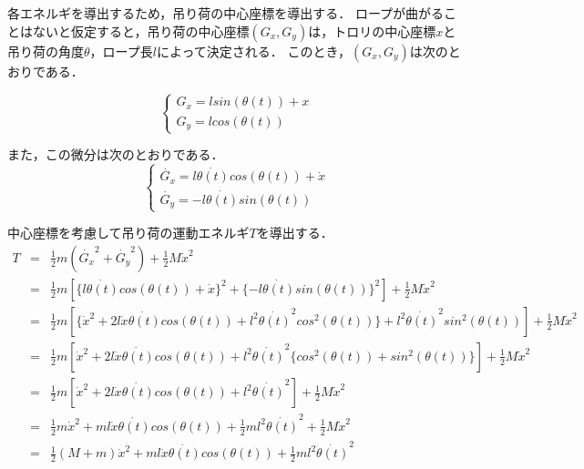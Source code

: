 \documentclass[dvipdfmx,titlepage,a4j]{jsarticle}  %
\begin{document}
各エネルギを導出するため，吊り荷の中心座標を導出する．
ロープが曲がることはないと仮定すると，吊り荷の中心座標$(G_x, G_y)$は，トロリの中心座標$x$と吊り荷の角度$\theta$，ロープ長$l$によって決定される．
このとき，$(G_x, G_y)$は次のとおりである．

\begin{equation}
  \begin{cases}
    G_x = l sin(\theta(t)) + x \nonumber \\
    G_y = l cos(\theta(t))
  \end{cases}
\end{equation}

また，この微分は次のとおりである．
\begin{equation}
  \begin{cases}
    \dot{G_x} = l \dot{\theta(t)} cos(\theta(t)) + \dot x \nonumber \\
    \dot{G_y} = -l \dot{\theta(t)} sin(\theta(t))
  \end{cases}
\end{equation}

中心座標を考慮して吊り荷の運動エネルギ$T$を導出する．
\begin{eqnarray}
  T &=& \frac{1}{2} m (\dot{G_x}^2 + \dot{G_y}^2) + \frac{1}{2}M\dot{x}^2\nonumber \\
  &=& \frac{1}{2} m [ \{l \dot{\theta(t)} cos(\theta(t)) + \dot x\}^2 + \{ -l \dot{\theta(t)} sin(\theta(t))\}^2 ] + \frac{1}{2}M\dot{x}^2 \nonumber \\
  &=& \frac{1}{2} m [\{ \dot x^2 + 2 l \dot{x} \dot{\theta(t)} cos(\theta(t)) + l^2 \dot{\theta(t)}^2 cos^2(\theta(t)) \} + l^2 \dot{\theta(t)}^2 sin^2(\theta(t))] + \frac{1}{2}M\dot{x}^2 \nonumber \\
  &=& \frac{1}{2} m [\dot x^2 + 2 l \dot{x} \dot{\theta(t)} cos(\theta(t)) + l^2 \dot{\theta(t)}^2 \{ cos^2(\theta(t)) + sin^2(\theta(t)) \}] + \frac{1}{2}M\dot{x}^2 \nonumber \\
  &=& \frac{1}{2} m [\dot x^2 + 2 l \dot{x} \dot{\theta(t)} cos(\theta(t)) + l^2 \dot{\theta(t)}^2] + \frac{1}{2}M\dot{x}^2 \nonumber \\
  &=& \frac{1}{2} m \dot x^2 + m l \dot{x} \dot{\theta(t)} cos(\theta(t)) + \frac{1}{2} m l^2 \dot{\theta(t)}^2 + \frac{1}{2}M\dot{x}^2 \nonumber \\
  &=& \frac{1}{2} (M + m)\dot x^2 + m l \dot{x} \dot{\theta(t)} cos(\theta(t)) + \frac{1}{2} m l^2 \dot{\theta(t)}^2 \label{eq:energy}
\end{eqnarray}
\end{document}
